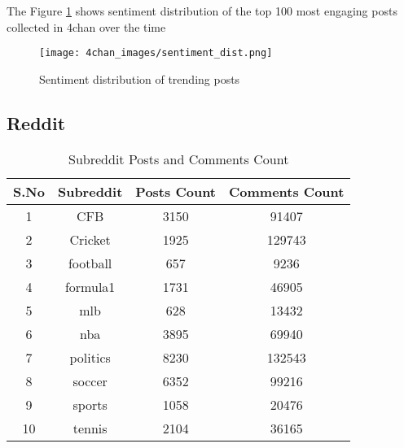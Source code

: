 \documentclass[sigconf]{acmart}
\begin{document}
The Figure \ref{fig:4chan_images/sentiment_dist} shows sentiment distribution of the top 100 most engaging posts collected in 4chan over the time\newline
\begin{figure}[h]
    \centering
    \texttt{[image: 4chan\_images/sentiment\_dist.png]} %
    \caption{Sentiment distribution of trending posts}
    \label{fig:4chan_images/sentiment_dist}
\end{figure}




\subsection{Reddit}

\begin{table}[h]
    \centering
    \begin{tabular}{|c|c|c|c|}
        \hline
        \textbf{S.No} & \textbf{Subreddit} & \textbf{Posts Count} & \textbf{Comments Count} \\ \hline
        1 & CFB       & 3150   & 91407   \\ \hline
        2 & Cricket   & 1925   & 129743  \\ \hline
        3 & football  & 657    & 9236    \\ \hline
        4 & formula1  & 1731   & 46905   \\ \hline
        5 & mlb       & 628    & 13432   \\ \hline
        6 & nba       & 3895   & 69940   \\ \hline
        7 & politics  & 8230   & 132543  \\ \hline
        8 & soccer    & 6352   & 99216   \\ \hline
        9 & sports    & 1058   & 20476   \\ \hline
        10 & tennis   & 2104   & 36165   \\ \hline
    \end{tabular}
    \caption{Subreddit Posts and Comments Count}
    \label{tab:subreddit_counts}
\end{table}
\end{document}
